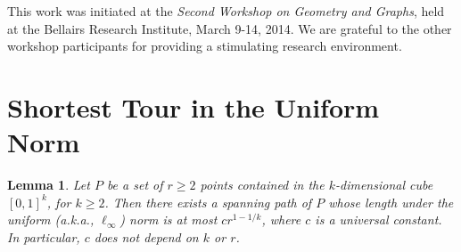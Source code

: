 \documentclass{patmorin}
\newtheorem{lemma}[theorem]{Lemma}
\begin{document}
This work was initiated at the \emph{Second Workshop on Geometry and Graphs},
held at the Bellairs Research Institute, March 9-14, 2014.  We are
grateful to the other workshop participants for providing a stimulating
research environment.






\appendix
\newpage
\section{Shortest Tour in the Uniform Norm}
\label{app:uniform-norm}

\begin{lemma}\label{lemma:tsp}
  Let $P$ be a set of $r\ge 2$ points contained in the $k$-dimensional
  cube $[0,1]^k$, for $k\ge 2$.  Then there exists a spanning path
  of $P$ whose length under the uniform (a.k.a.,
  $\ell_\infty$) norm is at most $cr^{1-1/k}$, where $c$ is a
  universal constant. In particular, $c$ does not depend on $k$ or $r$.
\end{lemma}
\end{document}
